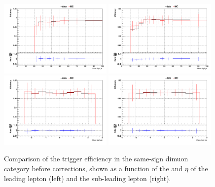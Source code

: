 \begin{figure}[htp]
\centering
\includegraphics[width=0.49\textwidth]{ch6_figs/1D_eff_lep1_pt_uu_ARCv2_change_3l_pt_ranges.pdf}
\includegraphics[width=0.49\textwidth]{ch6_figs/1D_eff_lep2_pt_uu_ARCv2_change_3l_pt_ranges.pdf} \\
\includegraphics[width=0.49\textwidth]{ch6_figs/1D_eff_lep1_eta_uu_ARCv2_change_3l_pt_ranges.pdf}
\includegraphics[width=0.49\textwidth]{ch6_figs/1D_eff_lep2_eta_uu_ARCv2_change_3l_pt_ranges.pdf}
\caption{Comparison of the trigger efficiency in the same-sign dimuon category before 
corrections, shown as a function of the \pt and $\eta$ of the leading lepton (left) 
and the sub-leading lepton (right).}
\label{fig:trigeffsmumu}
\end{figure}

